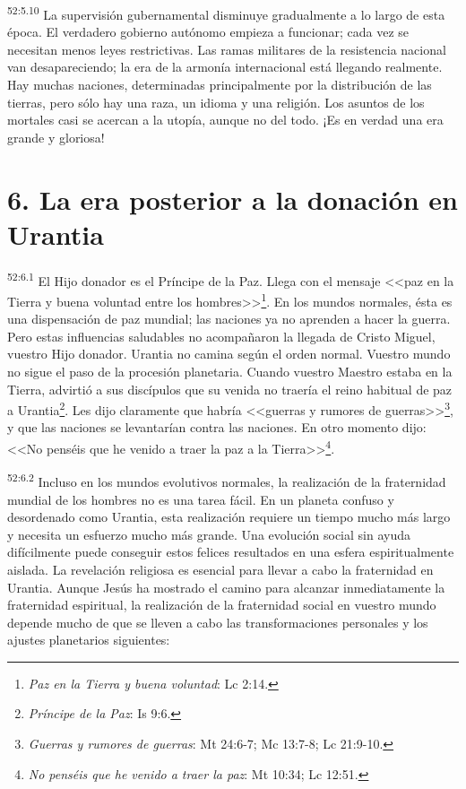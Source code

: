 \par
\textsuperscript{52:5.10} La supervisión gubernamental disminuye gradualmente a lo largo de esta época. El verdadero gobierno autónomo empieza a funcionar; cada vez se necesitan menos leyes restrictivas. Las ramas militares de la resistencia nacional van desapareciendo; la era de la armonía internacional está llegando realmente. Hay muchas naciones, determinadas principalmente por la distribución de las tierras, pero sólo hay una raza, un idioma y una religión. Los asuntos de los mortales casi se acercan a la utopía, aunque no del todo. ¡Es en verdad una era grande y gloriosa!

\section*{6. La era posterior a la donación en Urantia}
\par
\textsuperscript{52:6.1} El Hijo donador es el Príncipe de la Paz. Llega con el mensaje <<paz en la Tierra y buena voluntad entre los hombres>>\footnote{\textit{Paz en la Tierra y buena voluntad}: Lc 2:14.}. En los mundos normales, ésta es una dispensación de paz mundial; las naciones ya no aprenden a hacer la guerra. Pero estas influencias saludables no acompañaron la llegada de Cristo Miguel, vuestro Hijo donador. Urantia no camina según el orden normal. Vuestro mundo no sigue el paso de la procesión planetaria. Cuando vuestro Maestro estaba en la Tierra, advirtió a sus discípulos que su venida no traería el reino habitual de paz a Urantia\footnote{\textit{Príncipe de la Paz}: Is 9:6.}. Les dijo claramente que habría <<guerras y rumores de guerras>>\footnote{\textit{Guerras y rumores de guerras}: Mt 24:6-7; Mc 13:7-8; Lc 21:9-10.}, y que las naciones se levantarían contra las naciones. En otro momento dijo: <<No penséis que he venido a traer la paz a la Tierra>>\footnote{\textit{No penséis que he venido a traer la paz}: Mt 10:34; Lc 12:51.}.

\par
\textsuperscript{52:6.2} Incluso en los mundos evolutivos normales, la realización de la fraternidad mundial de los hombres no es una tarea fácil. En un planeta confuso y desordenado como Urantia, esta realización requiere un tiempo mucho más largo y necesita un esfuerzo mucho más grande. Una evolución social sin ayuda difícilmente puede conseguir estos felices resultados en una esfera espiritualmente aislada. La revelación religiosa es esencial para llevar a cabo la fraternidad en Urantia. Aunque Jesús ha mostrado el camino para alcanzar inmediatamente la fraternidad espiritual, la realización de la fraternidad social en vuestro mundo depende mucho de que se lleven a cabo las transformaciones personales y los ajustes planetarios siguientes:

